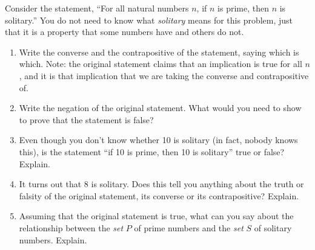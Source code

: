 \documentclass[11pt,]{book}
\theoremstyle{ptxplainnotitle}
\theoremstyle{ptxplaintitle}
\theoremstyle{ptxdefinitionnotitle}
\theoremstyle{ptxdefinitiontitle}
\theoremstyle{ptxdefinitionnotitle}
\theoremstyle{ptxdefinitiontitle}
\theoremstyle{ptxdefinitionnotitle}
\theoremstyle{ptxdefinitiontitle}
\theoremstyle{ptxdefinitiontitlenonumber}
\theoremstyle{ptxdefinitiontitlenonumber}
\numberwithin{equation}{chapter}
\begin{document}
\begin{divisionexercise}{22}\hypertarget{exercise-170}{}
\hypertarget{p-2236}{}%
Consider the statement, ``For all natural numbers \(n\), if \(n\) is prime, then \(n\) is solitary.''  You do not need to know what \emph{solitary} means for this problem, just that it is a property that some numbers have and others do not.%
\begin{enumerate}[font=\bfseries,label=(\alph*),ref=\alph*]
\item\label{task-1} \hypertarget{p-2237}{}%
Write the converse and the contrapositive of the statement, saying which is which.  Note: the original statement claims that an implication is true for all \(n\), and it is that implication that we are taking the converse and contrapositive of.%
\item\label{task-2} \hypertarget{p-2239}{}%
Write the negation of the original statement.  What would you need to show to prove that the statement is false?%
\item\label{task-3} \hypertarget{p-2241}{}%
Even though you don't know whether 10 is solitary (in fact, nobody knows this), is the statement ``if 10 is prime, then 10 is solitary'' true or false?  Explain.%
\item\label{task-4} \hypertarget{p-2243}{}%
It turns out that 8 is solitary.  Does this tell you anything about the truth or falsity of the original statement, its converse or its contrapositive?  Explain.%
\item\label{task-5} \hypertarget{p-2245}{}%
Assuming that the original statement is true, what can you say about the relationship between the \emph{set} \(P\) of prime numbers and the \emph{set} \(S\) of solitary numbers.  Explain.%
\end{enumerate}
\end{divisionexercise}%
\typeout{************************************************}
\typeout{************************************************}
\end{document}
